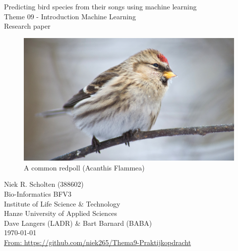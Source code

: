 
\begin{center}

    \Huge{Predicting bird species from their songs using machine learning}\\
    \vspace{\baselineskip}
    \LARGE{Theme 09 - Introduction Machine Learning}\\
    \large{Research paper}\\
    \vspace{\baselineskip}

    \begin{figure}
        \centering\includegraphics[width=\linewidth]{Acanthis_flammea}
        \caption{A common redpoll (Acanthis Flammea)}
        \label{fig:Acanthis_flammea}
    \end{figure}

\end{center}
\vspace{\baselineskip}

\normalsize
\vspace*{\fill}
\begin{flushright}
    Niek R. Scholten (388602)\\
    Bio-Informatics BFV3\\
    Institute of Life Science \& Technology\\
    Hanze University of Applied Sciences\\
    Dave Langers (LADR) \& Bart Barnard (BABA)\\
    \today\\
    \href{https://github.com/niek265/Thema9-Praktijkopdracht}{From: https://github.com/niek265/Thema9-Praktijkopdracht}
\end{flushright}
\newpage

